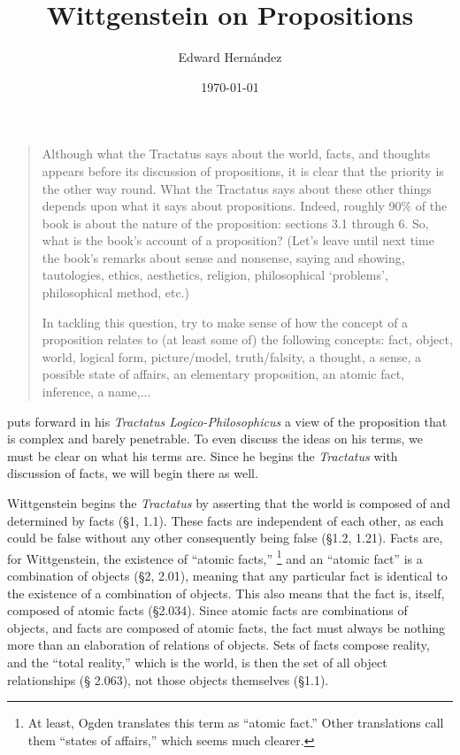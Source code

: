 \documentclass[12pt]{apa}
\begin{document}
\title{Wittgenstein on Propositions}
\author{Edward Hern\'{a}ndez}
\date{\today}

\maketitle

\vspace{-20pt}
\begin{quote}
	Although what the Tractatus says about the world, facts, and thoughts
	appears before its discussion of propositions, it is clear that the
	priority is the other way round.  What the Tractatus says about these other
	things depends upon what it says about propositions.  Indeed, roughly 90\%
	of the book is about the nature of the proposition: sections 3.1 through 6.
	So, what is the book’s account of a proposition?  (Let's leave until next
	time the book’s remarks about sense and nonsense, saying and showing,
	tautologies, ethics, aesthetics, religion, philosophical `problems',
	philosophical method, etc.) 

	In tackling this question, try to make sense of how the concept of a
	proposition relates to (at least some of) the following concepts: fact,
	object, world, logical form, picture/model, truth/falsity, a thought, a
	sense, a possible state of affairs, an elementary proposition, an atomic
	fact, inference, a name,... 
\end{quote}
\clearpage

  puts forward in his \emph{Tractatus
 Logico-Philosophicus} a view of the proposition that is complex and barely
 penetrable. To even discuss the ideas on his terms, we must be clear on what
 his terms are. Since he begins the \emph{Tractatus} with discussion of facts,
 we will begin there as well.

 Wittgenstein begins the \emph{Tractatus} by asserting that the world is
 composed of and determined by facts (\S 1, 1.1). These facts are independent
 of each other, as each could be false without any other consequently being
 false (\S 1.2, 1.21). Facts are, for Wittgenstein, the existence of “atomic
 facts,” \footnote{At least, Ogden translates this term as ``atomic fact.''
 Other translations call them ``states of affairs,'' which seems much clearer.}
 and an ``atomic fact''  is a combination of objects (\S 2, 2.01), meaning that
 any particular fact is identical to the existence of a combination of objects.
 This also means that the fact is, itself, composed of atomic facts (\S 2.034).
 Since atomic facts are combinations of objects, and facts are composed of
 atomic facts, the fact must always be nothing more than an elaboration of
 relations of objects. Sets of facts compose reality, and the ``total
 reality,'' which is the world, is then the set of all object relationships (\S
 2.063), not those objects themselves (\S 1.1).
\end{document}
